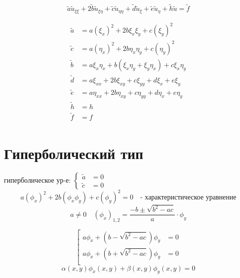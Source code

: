 \documentclass[a4paper]{article}
\begin{document}
\[
    \tilde{a}\tilde{u}_{\xi\xi} + 2\tilde{b}\tilde{u}_{\xi\eta} + \tilde{c}
    \tilde{u}_{\eta\eta} + \tilde{d}\tilde{u}_{\xi} + \tilde{e}\tilde{u}_\eta
    + \tilde{h}\tilde{u} = \tilde{f}
\]
\begin{tcolorbox}
    \begin{equation}
        \begin{aligned}
            \tilde{a} &= a(\xi_x)^2 + 2b\xi_x \xi_y + c(\xi_y)^2\\
            \tilde{c} &= a(\eta_x)^2 + 2b\eta_x \eta_y + c(\eta_y)^2\\
            \tilde{b} &= a \xi_x\eta_x + b(\xi_x\eta_y + \xi_y\eta_x) + c\xi_x\eta_y \\ 
            \tilde{d} &= a\xi_{xx} + 2b \xi_{xy} + c \xi_{yy} + d \xi_x + e \xi_y \\
            \tilde{e} &= a \eta_{xx} + 2b \eta_{xy} + c \eta_{yy} + d \eta_x + e \eta_y\\
            \tilde{h} &= h \\
            \tilde{f} &= f \\
        \end{aligned}
    \end{equation}
\end{tcolorbox}

\section*{\centering Гиперболический тип}
гиперболическое ур-е:
$
\begin{cases}
    \tilde{a} &= 0 \\
    \tilde{c} &= 0
\end{cases}
$
\begin{equation}
    a(\phi_x)^2 + 2b(\phi_x\phi_y) + c(\phi_y)^2 = 0 \quad
    \text{- характеристическое уравнение}
\end{equation}
\[
    a \neq 0 \quad (\phi_x)_{1,2} = \frac{-b \pm \sqrt{b^2-ac}}{a} \cdot \phi_y
\]

\begin{equation}
   \left[
       \begin{array}{ll}
           a\phi_x + (b - \sqrt{b^2 - ac})\phi_y &= 0 \\
           a\phi_x + (b + \sqrt{b^2 - ac})\phi_y &= 0 \\
       \end{array}
   \right .
\end{equation}
\[
    \alpha(x,y)\phi_x(x,y) + \beta(x,y)\phi_y(x,y) = 0
\]
\end{document}
